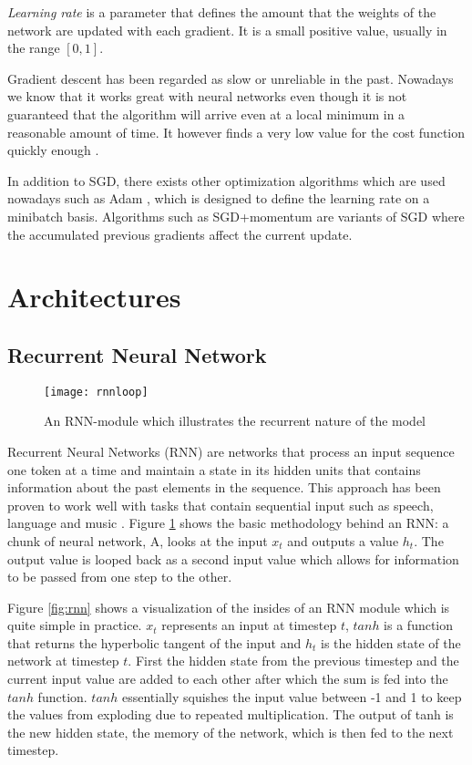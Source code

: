 \textit{Learning rate} is a parameter that defines the amount that the weights of the network are updated with each gradient.
It is a small positive value, usually in the range $[0, 1]$.

Gradient descent has been regarded as slow or unreliable in the past.
Nowadays we know that it works great with neural networks even though it is not guaranteed that the algorithm will arrive even at a local minimum in a reasonable amount of time.
It however finds a very low value for the cost function quickly enough \cite{goodfellow2016}.

In addition to SGD, there exists other optimization algorithms which are used nowadays such as Adam \cite{kingma2017}, which is designed to define the learning rate on a minibatch basis.
Algorithms such as SGD+momentum \cite{polyak1964} are variants of SGD where the accumulated previous gradients affect the current update.

\section{Architectures} \label{Architectures}
\subsection{Recurrent Neural Network} \label{Recurrent Neural Network}

\begin{figure}[t]
\texttt{[image: rnnloop]}
\centering
\caption{An RNN-module which illustrates the recurrent nature of the model}
\label{fig:rnnloop}
\end{figure}

Recurrent Neural Networks (RNN) are networks that process an input sequence one token at a time and maintain a state in its hidden units that contains information about the past elements in the sequence.
This approach has been proven to work well with tasks that contain sequential input such as speech, language and music \cite{lecun2015}.
Figure \ref{fig:rnnloop} shows the basic methodology behind an RNN: a chunk of neural network, A, looks at the input $x_t$ and outputs a value $h_t$. The output value is looped back as a second input value which allows for information to be passed from one step to the other.


Figure \ref{fig:rnn} shows a visualization of the insides of an RNN module which is quite simple in practice. $x_t$ represents an input at timestep $t$, $tanh$ is a function that returns the hyperbolic tangent of the input and $h_t$ is the hidden state of the network at timestep $t$.
First the hidden state from the previous timestep and the current input value are added to each other after which the sum is fed into the $tanh$ function.
$tanh$ essentially squishes the input value between -1 and 1 to keep the values from exploding due to repeated multiplication.
The output of tanh is the new hidden state, the memory of the network, which is then fed to the next timestep.



